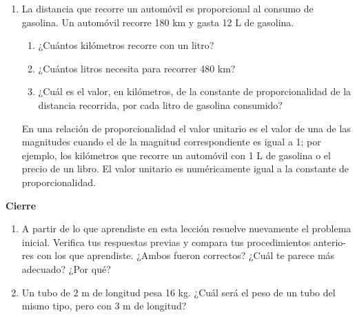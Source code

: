 \documentclass[11pt]{book}
\begin{document}
\begin{enumerate}

  \item La distancia que recorre un automóvil es proporcional al consumo de gasolina.
        Un automóvil recorre 180 km y gasta 12 L de gasolina.
        \begin{enumerate}
          \item ¿Cuántos kilómetros recorre con un litro?
          \item ¿Cuántos litros necesita para recorrer 480 km?
          \item ¿Cuál es el valor, en kilómetros, de la constante de proporcionalidad de la distancia recorrida, por cada litro de gasolina consumido?
        \end{enumerate}
        \begin{boxH}
          En una relación de proporcionalidad el valor unitario es el valor de una de las magnitudes cuando el de la magnitud correspondiente es igual a 1; por ejemplo, los
          kilómetros que recorre un automóvil con 1 L de gasolina o el precio de un libro. El
          valor unitario es numéricamente igual a la constante de proporcionalidad.
        \end{boxH}
\end{enumerate}

\begin{boxK}
  \begin{center}\textbf{Cierre}\end{center}

  \begin{enumerate}
    \item A partir de lo que aprendiste en esta lección resuelve nuevamente el problema
          inicial. Verifica tus respuestas previas y compara tus procedimientos anterio-
          res con los que aprendiste. ¿Ambos fueron correctos? ¿Cuál te parece más
          adecuado? ¿Por qué?
    \item Un tubo de 2 m de longitud pesa 16 kg. ¿Cuál será el peso de un tubo del mismo
          tipo, pero con 3 m de longitud?
  \end{enumerate}
\end{boxK}
\end{document}
